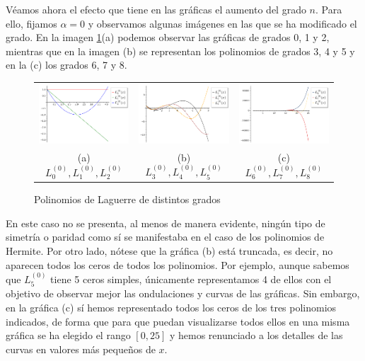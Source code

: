 Véamos ahora el efecto que tiene en las gráficas el aumento del grado $n$. Para ello, fijamos $\alpha=0$ y observamos algunas imágenes en las que se ha modificado el grado. En la imagen \ref{img:graficas-Laguerre-n}(a) podemos observar las gráficas de grados 0, 1 y 2, mientras que en la imagen (b) se representan los polinomios de grados 3, 4 y 5 y en la (c) los grados 6, 7 y 8.

\begin{figure}[h]
    \centering
    \begin{tabular}{ccc}
        \includegraphics[width=5cm]{img/C2/Laguerre4.png} & 
        \includegraphics[width=5cm]{img/C2/Laguerre5.png} &
        \includegraphics[width=5cm]{img/C2/Laguerre8.png} \\
        (a) $L_0^{(0)},L_1^{(0)},L_2^{(0)}$ & (b) $L_3^{(0)},L_4^{(0)},L_5^{(0)}$ & (c) $L_6^{(0)},L_7^{(0)},L_8^{(0)}$
    \end{tabular}
    \caption{Polinomios de Laguerre de distintos grados}
    \label{img:graficas-Laguerre-n}
\end{figure}

En este caso no se presenta, al menos de manera evidente, ningún tipo de simetría o paridad como sí se manifestaba en el caso de los polinomios de Hermite. Por otro lado, nótese que la gráfica (b) está truncada, es decir, no aparecen todos los ceros de todos los polinomios. Por ejemplo, aunque sabemos que $L_5^{(0)}$ tiene 5 ceros simples, únicamente representamos 4 de ellos con el objetivo de observar mejor las ondulaciones y curvas de las gráficas. Sin embargo, en la gráfica (c) sí hemos representado todos los ceros de los tres polinomios indicados, de forma que para que puedan visualizarse todos ellos en una misma gráfica se ha elegido el rango $[0,25]$ y hemos renunciado a los detalles de las curvas en valores más pequeños de $x$. 

